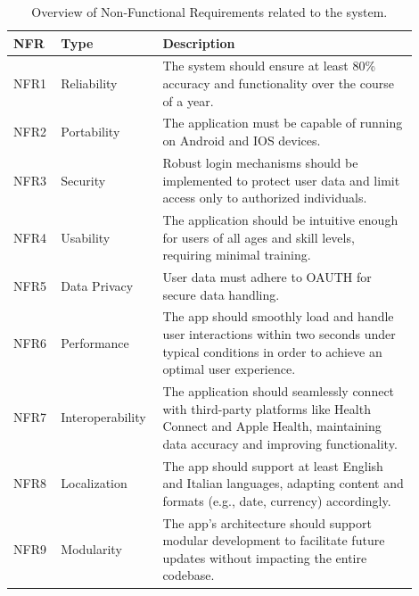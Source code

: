 \begin{table}[h!]
    \setstretch{\myspacing}
    \centering
    \begin{tabular}{|>{\raggedright\arraybackslash}p{0.1\linewidth}|>{\raggedright\arraybackslash}p{0.2\linewidth}|>{\raggedright\arraybackslash}p{0.6\linewidth}|}
        \hline
        \textbf{NFR} & \textbf{Type} & \textbf{Description} \\
        \hline
        NFR1 & Reliability & The system should ensure at least 80\% accuracy and functionality over the course of a year. \\
        \hline
        NFR2 & Portability & The application must be capable of running on Android and IOS devices. \\
        \hline
        NFR3 & Security & Robust login mechanisms should be implemented to protect user data and limit access only to authorized individuals. \\
        \hline
        NFR4 & Usability & The application should be intuitive enough for users of all ages and skill levels, requiring minimal training. \\
        \hline
        NFR5 & Data Privacy & User data must adhere to OAUTH for secure data handling. \\
        \hline
        NFR6 & Performance & The app should smoothly load and handle user interactions within two seconds under typical conditions in order to achieve an optimal user experience. \\
        \hline
        NFR7 & Interoperability & The application should seamlessly connect with third-party platforms like Health Connect and Apple Health, maintaining data accuracy and improving functionality. \\
        \hline
        NFR8 & Localization & The app should support at least English and Italian languages, adapting content and formats (e.g., date, currency) accordingly. \\
        \hline
        NFR9 & Modularity & The app's architecture should support modular development to facilitate future updates without impacting the entire codebase. \\
        \hline
    \end{tabular}
    \caption{Overview of Non-Functional Requirements related to the system.}
\end{table}
\newpage
